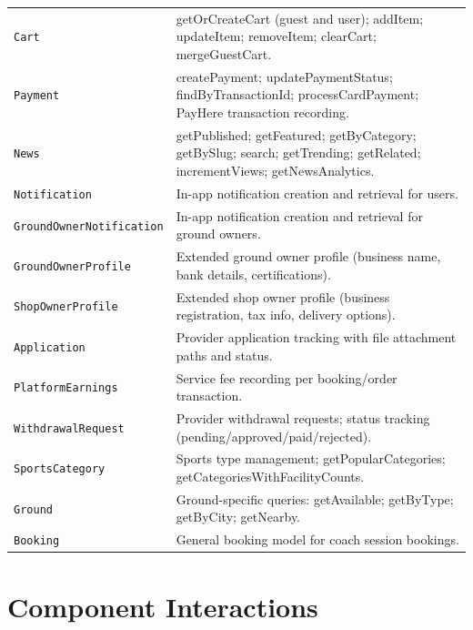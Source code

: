 \documentclass[12pt,a4paper]{report}
\begin{document}
\begin{center}
\begin{longtable}{p{4.8cm} p{9.7cm}}
\texttt{Cart}                 & getOrCreateCart (guest and user); addItem; updateItem; removeItem; clearCart; mergeGuestCart.\\
\texttt{Payment}              & createPayment; updatePaymentStatus; findByTransactionId; processCardPayment; PayHere transaction recording.\\
\texttt{News}                 & getPublished; getFeatured; getByCategory; getBySlug; search; getTrending; getRelated; incrementViews; getNewsAnalytics.\\
\texttt{Notification}         & In-app notification creation and retrieval for users.\\
\texttt{GroundOwnerNotification} & In-app notification creation and retrieval for ground owners.\\
\texttt{GroundOwnerProfile}   & Extended ground owner profile (business name, bank details, certifications).\\
\texttt{ShopOwnerProfile}     & Extended shop owner profile (business registration, tax info, delivery options).\\
\texttt{Application}          & Provider application tracking with file attachment paths and status.\\
\texttt{PlatformEarnings}     & Service fee recording per booking/order transaction.\\
\texttt{WithdrawalRequest}    & Provider withdrawal requests; status tracking (pending/approved/paid/rejected).\\
\texttt{SportsCategory}       & Sports type management; getPopularCategories; getCategoriesWithFacilityCounts.\\
\texttt{Ground}               & Ground-specific queries: getAvailable; getByType; getByCity; getNearby.\\
\texttt{Booking}              & General booking model for coach session bookings.\\
\bottomrule
\end{longtable}
\end{center}

\section{Component Interactions}
\end{document}
